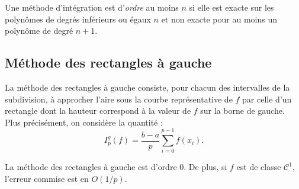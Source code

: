 
\begin{definition}
Une méthode d'intégration est d'\emph{ordre} au moins $n$ si elle est exacte sur les polynômes de degrés inférieurs ou égaux $n$ et non exacte pour au moins un polynôme de degré $n+1$.
\end{definition}

\subsection{Méthode des rectangles à gauche}

La méthode des rectangles à gauche consiste, pour chacun des intervalles de la subdivision, à approcher l'aire sous la courbe représentative de $f$ par celle d'un rectangle dont la hauteur correspond à la valeur de $f$ sur la borne de gauche. Plus précisément, on considère la quantité :
\[
I_p^g(f) = \frac{b-a}{p} \sum_{i=0}^{p-1} f(x_i).
\]
%
%

\begin{marginfigure}[0cm]
    \centering
    
\end{marginfigure}

\begin{prop}
La méthode des rectangles à gauche est d'ordre $0$. De plus, si $f$ est de classe $\mathscr{C}^1$, l'erreur commise est en $O(1/p)$.
\end{prop}


